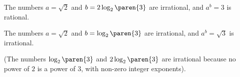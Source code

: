 The numbers $a = \sqrt{2}$ and $b = 2 \log_2\paren{3}$ are irrational,
and $a^b = 3$ is rational.

The numbers $a = \sqrt{2}$ and $b = \log_2\paren{3}$ are irrational,
and $a^b = \sqrt{3}$ is irrational.

(The numbers $\log_2\paren{3}$ and $2 \log_2\paren{3}$ are irrational
because no power of $2$ is a power of $3$,
with non-zero integer exponents).
